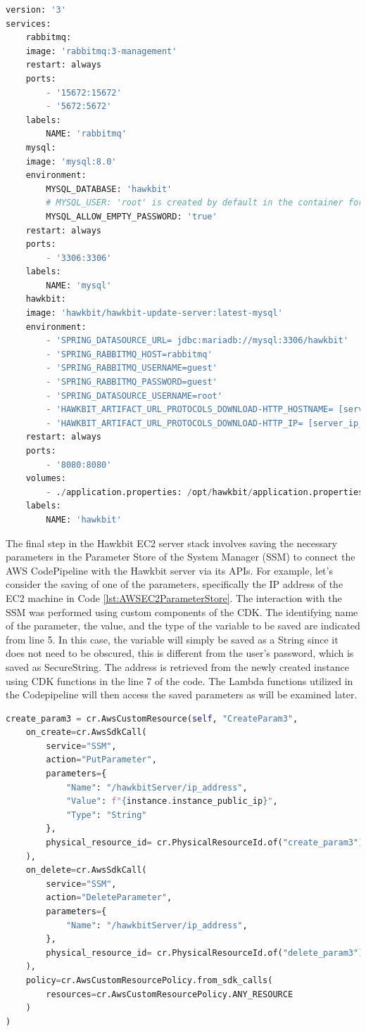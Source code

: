 \begin{lstlisting}[language=Python, caption={Hawkbit server Docker compose}, label=lst:AWSEC2DockerCompose]
version: '3'
services:
    rabbitmq:
    image: 'rabbitmq:3-management'
    restart: always
    ports:
        - '15672:15672'
        - '5672:5672'
    labels:
        NAME: 'rabbitmq'
    mysql:
    image: 'mysql:8.0'
    environment:
        MYSQL_DATABASE: 'hawkbit'
        # MYSQL_USER: 'root' is created by default in the container for mysql 8.0+
        MYSQL_ALLOW_EMPTY_PASSWORD: 'true'
    restart: always
    ports:
        - '3306:3306'
    labels:
        NAME: 'mysql'
    hawkbit:
    image: 'hawkbit/hawkbit-update-server:latest-mysql'
    environment:
        - 'SPRING_DATASOURCE_URL= jdbc:mariadb://mysql:3306/hawkbit'
        - 'SPRING_RABBITMQ_HOST=rabbitmq'
        - 'SPRING_RABBITMQ_USERNAME=guest'
        - 'SPRING_RABBITMQ_PASSWORD=guest'
        - 'SPRING_DATASOURCE_USERNAME=root'
        - 'HAWKBIT_ARTIFACT_URL_PROTOCOLS_DOWNLOAD-HTTP_HOSTNAME= [server_ip_address]'
        - 'HAWKBIT_ARTIFACT_URL_PROTOCOLS_DOWNLOAD-HTTP_IP= [server_ip_address]'
    restart: always
    ports:
        - '8080:8080'
    volumes:
        - ./application.properties: /opt/hawkbit/application.properties
    labels:
        NAME: 'hawkbit'
    \end{lstlisting}

The final step in the Hawkbit EC2 server stack involves saving the necessary parameters in the Parameter Store of the System Manager (SSM) to connect the AWS CodePipeline with the Hawkbit server via its APIs. For example, let's consider the saving of one of the parameters, specifically the IP address of the EC2 machine in Code \ref{lst:AWSEC2ParameterStore}. The interaction with the SSM was performed using custom components of the CDK. The identifying name of the parameter, the value, and the type of the variable to be saved are indicated from line 5. In this case, the variable will simply be saved as a String since it does not need to be obscured, this is different from the user's password, which is saved as SecureString. The address is retrieved from the newly created instance using CDK functions in the line 7 of the code. The Lambda functions utilized in the Codepipeline will then access the saved parameters as will be examined later.
\begin{lstlisting}[language=Python, caption={Hawkbit server Docker compose}, label=lst:AWSEC2ParameterStore]
    create_param3 = cr.AwsCustomResource(self, "CreateParam3",
    on_create=cr.AwsSdkCall(
        service="SSM",
        action="PutParameter",
        parameters={
            "Name": "/hawkbitServer/ip_address",
            "Value": f"{instance.instance_public_ip}",
            "Type": "String"
        },
        physical_resource_id= cr.PhysicalResourceId.of("create_param3")
    ),
    on_delete=cr.AwsSdkCall(
        service="SSM",
        action="DeleteParameter",
        parameters={
            "Name": "/hawkbitServer/ip_address",
        },
        physical_resource_id= cr.PhysicalResourceId.of("delete_param3")
    ),
    policy=cr.AwsCustomResourcePolicy.from_sdk_calls(
        resources=cr.AwsCustomResourcePolicy.ANY_RESOURCE
    )
)
\end{lstlisting}

